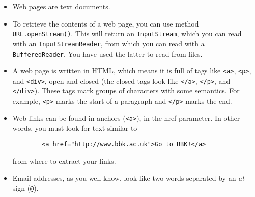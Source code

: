 \documentclass{article}
\begin{document}
\begin{itemize}
\item Web pages are text documents.
\item To retrieve the contents of a web page, you can use method
  \verb+URL.openStream()+. This will return an \verb+InputStream+,
  which you can read with an \verb+InputStreamReader+, from which you
  can read with a \verb+BufferedReader+. You have used the latter to
  read from files.
\item A web page is written in HTML, which means it is full of tags
  like \verb+<a>+, \verb+<p>+, and \verb+<div>+, open and closed (the
  closed tags look like \verb+</a>+, \verb+</p>+, and
  \verb+</div>+). These tags mark groups of characters with some
  semantics. For example, \verb+<p>+ marks the start of a paragraph
  and  \verb+</p>+ marks the end.
\item Web links can be found in anchors (\verb+<a>+), in the href
  parameter. In other words, you must look for text similar to 
  \begin{verbatim}
        <a href="http://www.bbk.ac.uk">Go to BBK!</a>
  \end{verbatim}
  from where to extract your links.
\item Email addresses, as you well know, look like two words separated
  by an \emph{at} sign (\verb+@+).
\end{itemize}
\end{document}
